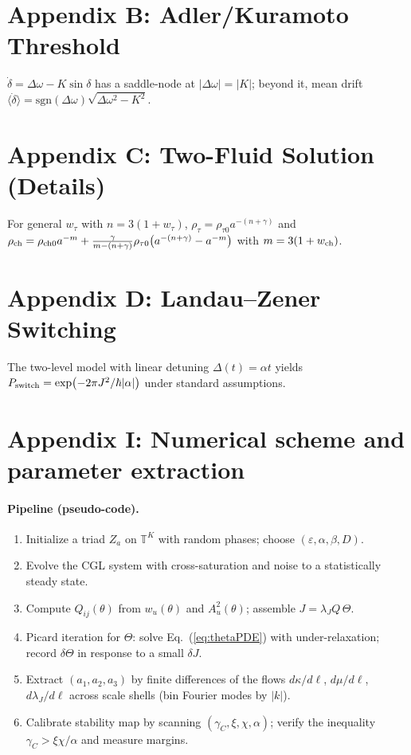 \documentclass[11pt]{article}
\newcommand{\TT}{\mathbb T}
\begin{document}
\section*{Appendix B: Adler/Kuramoto Threshold}
$\dot\delta=\Delta\omega-K\sin\delta$ has a saddle-node at $|\Delta\omega|=|K|$; beyond it, mean drift $\langle\dot\delta\rangle=\mathrm{sgn}(\Delta\omega)\sqrt{\Delta\omega^2-K^2}$.

\section*{Appendix C: Two-Fluid Solution (Details)}
For general $w_\tau$ with $n=3(1+w_\tau)$, $\rho_\tau=\rho_{\tau 0}a^{-(n+\gamma)}$ and $\rho_{\rm ch}=\rho_{{\rm ch}0}a^{-m}+\frac{\gamma}{m-(n+\gamma)}\rho_{\tau 0}\big(a^{-(n+\gamma)}-a^{-m}\big)$ with $m=3(1+w_{\rm ch})$.

\section*{Appendix D: Landau--Zener Switching}
The two-level model with linear detuning $\Delta(t)=\alpha t$ yields $P_{\rm switch}=\exp(-2\pi J^2/\hbar|\alpha|)$ under standard assumptions.

\section*{Appendix I: Numerical scheme and parameter extraction}\label{app:numerics}
\paragraph{Pipeline (pseudo-code).}
\begin{enumerate}
\item Initialize a triad $Z_a$ on $\TT^K$ with random phases; choose $(\varepsilon,\alpha,\beta,D)$.
\item Evolve the CGL system with cross-saturation and noise to a statistically steady state.
\item Compute $Q_{ij}(\theta)$ from $w_u(\theta)$ and $A_u^2(\theta)$; assemble $J=\lambda_J Q\,\Theta$.
\item Picard iteration for $\Theta$: solve Eq.~(\ref{eq:thetaPDE}) with under-relaxation; record $\delta\Theta$ in response to a small $\delta J$.
\item Extract $(a_1,a_2,a_3)$ by finite differences of the flows $d\kappa/d\ell$, $d\mu/d\ell$, $d\lambda_J/d\ell$ across scale shells (bin Fourier modes by $|k|$).
\item Calibrate stability map by scanning $(\gamma_C,\xi,\chi,\alpha)$; verify the inequality $\gamma_C>\xi\chi/\alpha$ and measure margins.
\end{enumerate}
\end{document}
